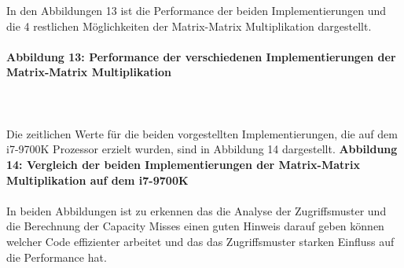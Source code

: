 \documentclass[sigconf,language=english]{acmart}
\begin{document}
In den Abbildungen 13 ist die Performance der beiden Implementierungen und die 4 restlichen 
Möglichkeiten der Matrix-Matrix Multiplikation dargestellt.\\\\ %
\textbf{Abbildung 13: Performance der verschiedenen Implementierungen der Matrix-Matrix Multiplikation}
\\\\\\\\
Die zeitlichen Werte für die beiden vorgestellten Implementierungen, 
die auf dem i7-9700K Prozessor erzielt wurden, sind in Abbildung 14 dargestellt.
\textbf{Abbildung 14: Vergleich der beiden Implementierungen der Matrix-Matrix Multiplikation auf dem i7-9700K}
\\\\
In beiden Abbildungen ist zu erkennen das die Analyse der Zugriffsmuster und die Berechnung der Capacity Misses
einen guten Hinweis darauf geben können welcher Code effizienter arbeitet und das das Zugriffsmuster starken
Einfluss auf die Performance hat.



\begin{acks}

\end{acks}





\appendix
\end{document}
